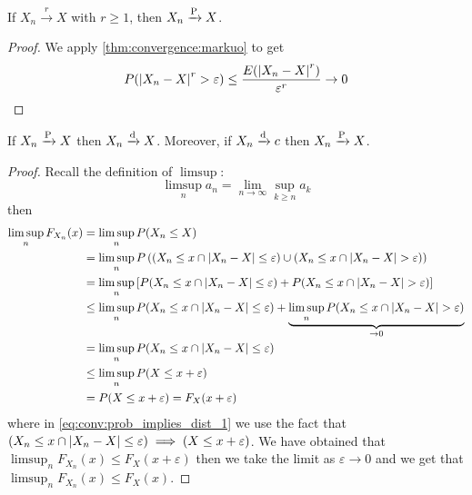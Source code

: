 \documentclass[12pt]{extarticle}
\newcommand{\convdist}{\xrightarrow{\operatorfont d}}
\newcommand{\convprob}{\xrightarrow{\operatorfont P}}
\newcommand{\convmean}[1]{\xrightarrow{#1}}
\begin{document}
\begin{theorem}
    If $X_n \convmean{r} X$ with $r \geq 1$, then $X_n \convprob X$.
\end{theorem}
\begin{proof}
    We apply \autoref{thm:convergence:markuo} to get
    \begin{equation}
        P(\abs{X_n - X}^r > \varepsilon) \leq \frac{E(\abs{X_n - X}^r)}{\varepsilon^r} \to 0
    \end{equation}
\end{proof}

\begin{theorem}
    \label{thm:conv:prob_implies_dist}
    If $X_n \convprob X$ then $X_n \convdist X$.
    Moreover, if $X_n \convdist c$ then $X_n \convprob X$.
\end{theorem}
\begin{proof}
    Recall the definition of $\limsup$:
    \begin{equation}
        \limsup_n a_n = \lim_{n \to \infty} \sup_{k \geq n} a_k
    \end{equation}
    then
    \begin{align}
        \limsup_n F_{X_n}(x) & = \limsup_n P(X_n \leq X)                                                                                                                      \\
                             & = \limsup_n P\left( (X_n \leq x \cap \abs{X_n -X} \leq \varepsilon) \cup (X_n \leq x \cap \abs{X_n -X} > \varepsilon)\right)                   \\
                             & = \limsup_n \left[P(X_n \leq x \cap \abs{X_n -X} \leq \varepsilon) + P(X_n \leq x \cap \abs{X_n -X} > \varepsilon)\right]                      \\
                             & \leq \limsup_n P(X_n \leq x \cap \abs{X_n -X} \leq \varepsilon) + \underbrace{\limsup_n P(X_n \leq x \cap \abs{X_n -X} > \varepsilon)}_{\to 0} \\
                             & = \limsup_n P(X_n \leq x \cap \abs{X_n -X} \leq \varepsilon)                                                                                   \\
                             & \leq \limsup_n P(X \leq x + \varepsilon) \label{eq:conv:prob_implies_dist_1}                                                                   \\
                             & = P(X \leq x + \varepsilon) = F_X(x + \varepsilon)
    \end{align}
    where in \autoref{eq:conv:prob_implies_dist_1} we use the fact that $(X_n \leq x \cap \abs{X_n -X} \leq \varepsilon) \implies (X \leq x + \varepsilon)$.
    We have obtained that $\limsup_n F_{X_n}(x) \leq F_X(x + \varepsilon)$ then we take the limit as $\varepsilon \to 0$ and we get that $\limsup_n F_{X_n}(x) \leq F_X(x)$.


\end{proof}
\end{document}
